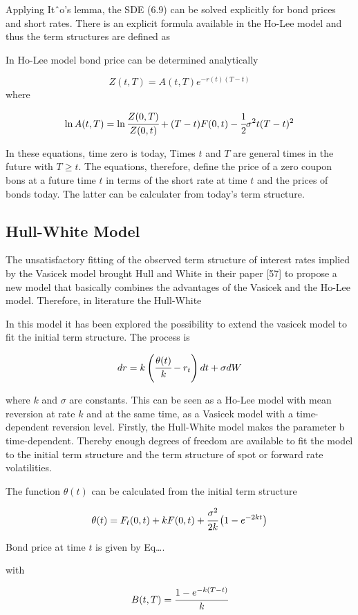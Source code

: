 Applying Itˆo’s lemma, the SDE (6.9) can be solved explicitly for bond prices and short rates. There is an explicit formula available in the Ho-Lee model and thus the term structures are defined as

In Ho-Lee model bond price can be determined analytically

\[Z(t, T)=A(t, T)e^{-r(t)(T-t)}\]
where

\[\ln A(t, T)=\ln\cfrac{Z(0,T)}{Z(0,t)}+(T-t)F(0,t)-\cfrac{1}{2}\sigma^2 t(T-t)^2\]

In these equations, time zero is today, Times \(t\) and \(T\) are
general times in the future with \(T\geq t\). The equations, therefore,
define the price of a zero coupon bons at a future time \(t\) in terms
of the short rate at time \(t\) and the prices of bonds today. The
latter can be calculater from today's term structure.

\subsection{Hull-White Model}
\label{hull-white-model}
The unsatisfactory fitting of the observed term structure of interest rates implied by the Vasicek model brought Hull and White in their paper [57] to propose a new model that basically combines the advantages of the Vasicek and the Ho-Lee model. Therefore, in literature the Hull-White

In this model it has been explored the possibility to extend the vasicek
model to fit the initial term structure. The process is

\[dr = k\left(\cfrac{\theta(t)}{k}-r_t \right)dt + \sigma dW\]

where \(k\) and \(\sigma\) are constants. This can be seen as a Ho-Lee
model with mean reversion at rate \(k\) and at the same time, as a
Vasicek model with a time-dependent reversion level.
Firstly, the Hull-White model makes the parameter b time-dependent. Thereby enough degrees of freedom are available to fit the model to the initial term structure and the term structure of spot or forward rate volatilities.

The function \(\theta(t)\) can be calculated from the initial term
structure

\[\theta(t)=F_t(0,t)+kF(0,t)+\cfrac{\sigma^2}{2k}\left(1-e^{-2kt}\right)\]

Bond price at time \(t\) is given by Eq\ldots{}.

with

\[B(t,T)=\cfrac{1-e^{-k(T-t)}}{k}\]

